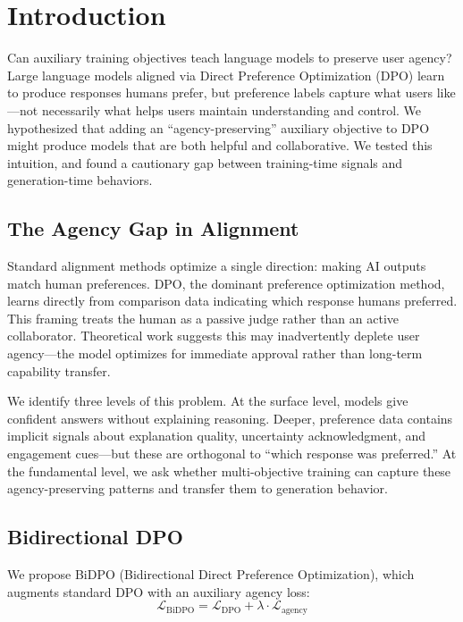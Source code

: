 \section{Introduction}

Can auxiliary training objectives teach language models to preserve user agency? Large language models aligned via Direct Preference Optimization (DPO) learn to produce responses humans prefer, but preference labels capture what users like---not necessarily what helps users maintain understanding and control. We hypothesized that adding an ``agency-preserving'' auxiliary objective to DPO might produce models that are both helpful and collaborative. We tested this intuition, and found a cautionary gap between training-time signals and generation-time behaviors.

\subsection{The Agency Gap in Alignment}

Standard alignment methods optimize a single direction: making AI outputs match human preferences. DPO, the dominant preference optimization method, learns directly from comparison data indicating which response humans preferred. This framing treats the human as a passive judge rather than an active collaborator. Theoretical work suggests this may inadvertently deplete user agency---the model optimizes for immediate approval rather than long-term capability transfer.

We identify three levels of this problem. At the surface level, models give confident answers without explaining reasoning. Deeper, preference data contains implicit signals about explanation quality, uncertainty acknowledgment, and engagement cues---but these are orthogonal to ``which response was preferred.'' At the fundamental level, we ask whether multi-objective training can capture these agency-preserving patterns and transfer them to generation behavior.

\subsection{Bidirectional DPO}

We propose BiDPO (Bidirectional Direct Preference Optimization), which augments standard DPO with an auxiliary agency loss:
\begin{equation}
\mathcal{L}_{\text{BiDPO}} = \mathcal{L}_{\text{DPO}} + \lambda \cdot \mathcal{L}_{\text{agency}}
\end{equation}

